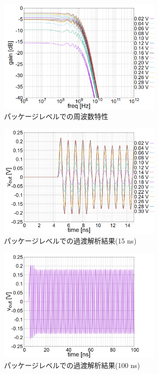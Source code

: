 \documentclass[twocolumn]{jsarticle}
\begin{document}
    \begin{figure}[H]
        \begin{center}
            \includegraphics*[width = 80mm]{figures/sim_all_ac_gain.PNG}
            \caption{パッケージレベルでの周波数特性}
            \label{fig:sim_all_ac}
        \end{center}
    \end{figure}
    \begin{figure}[H]
        \begin{center}
            \includegraphics*[width = 80mm]{figures/sim_all_tr.PNG}
            \caption{パッケージレベルでの過渡解析結果(15 ns)}
            \label{fig:sim_all_tr}
        \end{center}
    \end{figure}
    \begin{figure}[H]
        \begin{center}
            \includegraphics*[width = 80mm]{figures/sim_all_tr_envelope.PNG}
            \caption{パッケージレベルでの過渡解析結果(100 ns)}
            \label{fig:sim_all_tr_envelope}
        \end{center}
    \end{figure}
\end{document}
